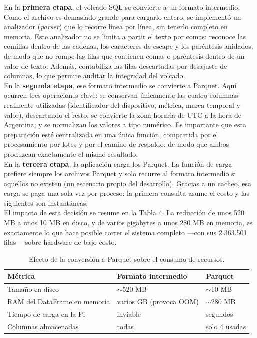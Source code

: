 En la \textbf{primera etapa}, el volcado SQL se convierte a un formato intermedio. Como el archivo es demasiado grande para cargarlo entero, se implementó un analizador (\textit{parser}) que lo recorre línea por línea, sin tenerlo completo en memoria. Este analizador no se limita a partir el texto por comas: reconoce las comillas dentro de las cadenas, los caracteres de escape y los paréntesis anidados, de modo que no rompe las filas que contienen comas o paréntesis dentro de un valor de texto. Además, contabiliza las filas descartadas por desajuste de columnas, lo que permite auditar la integridad del volcado.\\

En la \textbf{segunda etapa}, ese formato intermedio se convierte a Parquet. Aquí ocurren tres operaciones clave: se conservan únicamente las cuatro columnas realmente utilizadas (identificador del dispositivo, métrica, marca temporal y valor), descartando el resto; se convierte la zona horaria de UTC a la hora de Argentina; y se normalizan los valores a tipo numérico. Es importante que esta preparación esté centralizada en una única función, compartida por el procesamiento por lotes y por el camino de respaldo, de modo que ambos produzcan exactamente el mismo resultado.\\

En la \textbf{tercera etapa}, la aplicación carga los Parquet. La función de carga prefiere siempre los archivos Parquet y solo recurre al formato intermedio si aquellos no existen (un escenario propio del desarrollo). Gracias a un cacheo, esa carga se paga una sola vez por proceso: la primera consulta asume el costo y las siguientes son instantáneas.\\

El impacto de esta decisión se resume en la Tabla 4. La reducción de unos 520 MB a unos 10 MB en disco, y de varios gigabytes a unos 280 MB en memoria, es exactamente lo que hace posible correr el sistema completo —con sus 2.363.501 filas— sobre hardware de bajo costo.\\


\begin{table}[h!]
\centering
\begin{tabular}{lll}
\hline
Métrica & Formato intermedio & Parquet \\
\hline
Tamaño en disco & $\sim$520 MB & $\sim$10 MB \\
RAM del DataFrame en memoria & varios GB (provoca OOM) & $\sim$280 MB \\
Tiempo de carga en la Pi & inviable & segundos \\
Columnas almacenadas & todas & solo 4 usadas \\
\hline
\end{tabular}
\caption{Efecto de la conversión a Parquet sobre el consumo de recursos.}
\end{table}

